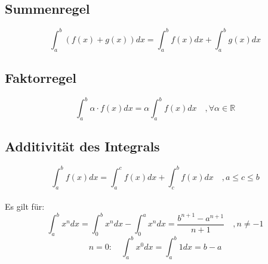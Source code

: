 \subsection{Summenregel}
\[ \boxed{\int_a^b (f(x) + g(x)) dx = \int_a^b f(x) dx + \int_a^b g(x) dx} \]

\subsection{Faktorregel}
\[ \boxed{\int_a^b \alpha \cdot f(x) dx = \alpha \int_a^b f(x) dx \quad , \forall \alpha \in \mathbb{R}} \]

\subsection{Additivität des Integrals}
\[ \boxed{\int_a^b f(x) dx = \int_a^c f(x) dx + \int_c^b f(x) dx \quad , a \leq c \leq b} \]
\\
Es gilt für: 
\[ \boxed{\int_a^b x^n dx = \int_0^b x^n dx - \int_0^a x^n dx = \frac{b^{n+1} - a^{n+1}}{n + 1} \quad , n \neq -1} \]
\[ \boxed{n = 0: \quad \int_a^b x^0 dx = \int_a^b 1 dx = b - a} \]
